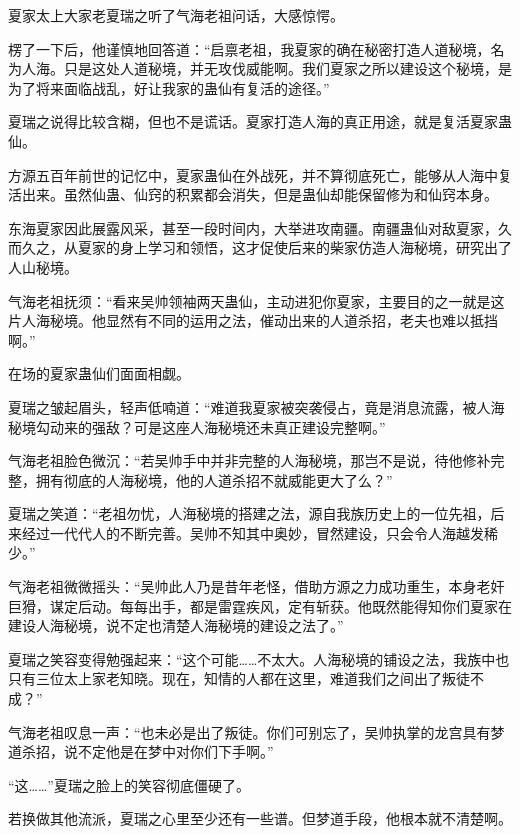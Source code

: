 
\begin{this_body}



夏家太上大家老夏瑞之听了气海老祖问话，大感惊愕。

楞了一下后，他谨慎地回答道：“启禀老祖，我夏家的确在秘密打造人道秘境，名为人海。只是这处人道秘境，并无攻伐威能啊。我们夏家之所以建设这个秘境，是为了将来面临战乱，好让我家的蛊仙有复活的途径。”

夏瑞之说得比较含糊，但也不是谎话。夏家打造人海的真正用途，就是复活夏家蛊仙。

方源五百年前世的记忆中，夏家蛊仙在外战死，并不算彻底死亡，能够从人海中复活出来。虽然仙蛊、仙窍的积累都会消失，但是蛊仙却能保留修为和仙窍本身。

东海夏家因此展露风采，甚至一段时间内，大举进攻南疆。南疆蛊仙对敌夏家，久而久之，从夏家的身上学习和领悟，这才促使后来的柴家仿造人海秘境，研究出了人山秘境。

气海老祖抚须：“看来吴帅领袖两天蛊仙，主动进犯你夏家，主要目的之一就是这片人海秘境。他显然有不同的运用之法，催动出来的人道杀招，老夫也难以抵挡啊。”

在场的夏家蛊仙们面面相觑。

夏瑞之皱起眉头，轻声低喃道：“难道我夏家被突袭侵占，竟是消息流露，被人海秘境勾动来的强敌？可是这座人海秘境还未真正建设完整啊。”

气海老祖脸色微沉：“若吴帅手中并非完整的人海秘境，那岂不是说，待他修补完整，拥有彻底的人海秘境，他的人道杀招不就威能更大了么？”

夏瑞之笑道：“老祖勿忧，人海秘境的搭建之法，源自我族历史上的一位先祖，后来经过一代代人的不断完善。吴帅不知其中奥妙，冒然建设，只会令人海越发稀少。”

气海老祖微微摇头：“吴帅此人乃是昔年老怪，借助方源之力成功重生，本身老奸巨猾，谋定后动。每每出手，都是雷霆疾风，定有斩获。他既然能得知你们夏家在建设人海秘境，说不定也清楚人海秘境的建设之法了。”

夏瑞之笑容变得勉强起来：“这个可能……不太大。人海秘境的铺设之法，我族中也只有三位太上家老知晓。现在，知情的人都在这里，难道我们之间出了叛徒不成？”

气海老祖叹息一声：“也未必是出了叛徒。你们可别忘了，吴帅执掌的龙宫具有梦道杀招，说不定他是在梦中对你们下手啊。”

“这……”夏瑞之脸上的笑容彻底僵硬了。

若换做其他流派，夏瑞之心里至少还有一些谱。但梦道手段，他根本就不清楚啊。


\end{this_body}
